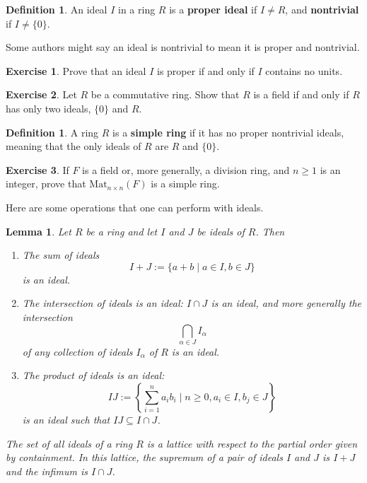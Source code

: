 \documentclass[12pt]{report}
\newtheorem{lemma}[theorem]{Lemma}
\numberwithin{equation}{section}
\numberwithin{theorem}{chapter}
\theoremstyle{definition}
\newtheorem{definition}[theorem]{Definition}
\newtheorem{exercise}{Exercise}
\newtheorem*{basic properties}{Basic Properties}
\newtheorem*{Important Remark}{Important Remark}
\newcommand{\df}[1]{{\bf #1}\index{#1}}
\begin{document}
\begin{definition}
	An ideal $I$ in a ring $R$ is a {\bf proper ideal} if $I\neq R$, and {\bf nontrivial} if $I \neq \{ 0 \}$. 
\end{definition}


Some authors might say an ideal is nontrivial to mean it is proper and nontrivial.


\begin{exercise}
Prove that an ideal $I$ is proper if and only if $I$ contains no units.
\end{exercise}


\begin{exercise}\label{field iff only 2 ideals}
	Let $R$ be a commutative ring. Show that $R$ is a field if and only if $R$ has only two ideals, $\{0\}$ and $R$.
\end{exercise}

\begin{definition}
	A ring $R$ is a \df{simple ring} if it has no proper nontrivial ideals, meaning that the only ideals of $R$ are $R$ and $\{ 0 \}$.
\end{definition}

\begin{exercise} 
If $F$ is a field  or, more generally, a division ring, and $n \geqslant 1$ is an integer, prove that $\mathrm{Mat}_{n \times n}(F)$ is a simple ring.
\end{exercise}


Here are some operations that one can perform with ideals. 

\begin{lemma}\label{ideal lattice} 
Let $R$ be a ring and let $I$ and $J$ be ideals of $R$.
Then
\begin{enumerate}[itemsep=0.1em]
\item The sum of ideals 
$$I + J := \{a + b \mid a \in I, b \in J\}$$
is an ideal.
\item The intersection of ideals is an ideal: $I\cap J$ is an ideal, and more generally the intersection 
$$\bigcap_{\alpha \in J} I_\alpha$$ 
of any collection of ideals $I_\alpha$ of $R$ is an ideal.
\item The product of ideals is an ideal:
$$IJ := \left\lbrace \sum_{i=1}^n a_ib_i \mid n \geqslant 0, a_i \in I, b_j\in J \right\rbrace$$ 
is an ideal such that $IJ \subseteq I\cap J$. 
\end{enumerate}
The set of all ideals of a ring $R$ is a lattice with respect to the partial order given by containment. In this lattice, the supremum of a pair of ideals $I$ and $J$ is $I+J$ and the infimum is $I\cap J$.
\end{lemma}
\end{document}
